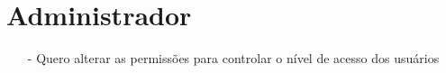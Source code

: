 \documentclass[12pt,a4paper]{report}
\begin{document}
\section{Administrador}
\begin{itemize}
\item[-] Quero alterar as permissões para controlar o nível de acesso dos usuários
\end{itemize}
%
\end{document}
